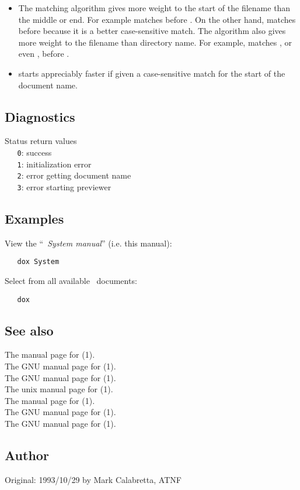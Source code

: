 \begin{itemize}
\item
   The matching algorithm gives more weight to the start of the filename than
   the middle or end.  For example  matches  before
   .  On the other hand,  matches  before
    because it is a better case-sensitive match.  The algorithm
   also gives more weight to the filename than directory name.  For example,
    matches , or even , before
   .

\item
    starts appreciably faster if given a case-sensitive match for the
   start of the document name.
\end{itemize}

\subsection*{Diagnostics}

Status return values
\\ \verb+   0+:  success
\\ \verb+   1+:  initialization error
\\ \verb+   2+:  error getting document name
\\ \verb+   3+:  error starting previewer

\subsection*{Examples}

View the ``\textit{\aipspp\ System manual}'' (i.e. this manual):

\begin{verbatim}
   dox System
\end{verbatim}

\noindent
Select from all available \aipspp\ documents:

\begin{verbatim}
   dox
\end{verbatim}

\subsection*{See also}

The manual page for (1).\\
The GNU manual page for (1).\\
The GNU manual page for (1).\\
The unix manual page for (1).\\
The manual page for (1).\\
The GNU manual page for (1).\\
The GNU manual page for (1).

\subsection*{Author}

Original: 1993/10/29 by Mark Calabretta, ATNF
